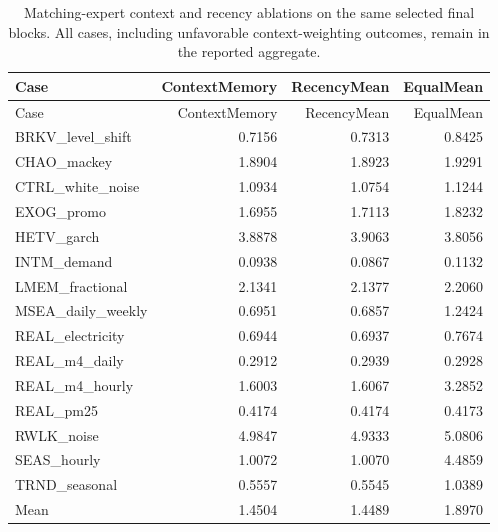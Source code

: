 \begin{longtable}{lrrr}
\caption{Matching-expert context and recency ablations on the same selected final blocks. All cases, including unfavorable context-weighting outcomes, remain in the reported aggregate.}\label{tab:fixed-ablations}\\
\toprule Case & ContextMemory & RecencyMean & EqualMean\\\midrule\endfirsthead
\toprule Case & ContextMemory & RecencyMean & EqualMean\\\midrule\endhead
BRKV\_level\_shift & 0.7156 & 0.7313 & 0.8425\\
CHAO\_mackey & 1.8904 & 1.8923 & 1.9291\\
CTRL\_white\_noise & 1.0934 & 1.0754 & 1.1244\\
EXOG\_promo & 1.6955 & 1.7113 & 1.8232\\
HETV\_garch & 3.8878 & 3.9063 & 3.8056\\
INTM\_demand & 0.0938 & 0.0867 & 0.1132\\
LMEM\_fractional & 2.1341 & 2.1377 & 2.2060\\
MSEA\_daily\_weekly & 0.6951 & 0.6857 & 1.2424\\
REAL\_electricity & 0.6944 & 0.6937 & 0.7674\\
REAL\_m4\_daily & 0.2912 & 0.2939 & 0.2928\\
REAL\_m4\_hourly & 1.6003 & 1.6067 & 3.2852\\
REAL\_pm25 & 0.4174 & 0.4174 & 0.4173\\
RWLK\_noise & 4.9847 & 4.9333 & 5.0806\\
SEAS\_hourly & 1.0072 & 1.0070 & 4.4859\\
TRND\_seasonal & 0.5557 & 0.5545 & 1.0389\\
\midrule Mean & 1.4504 & 1.4489 & 1.8970\\
\bottomrule
\end{longtable}
